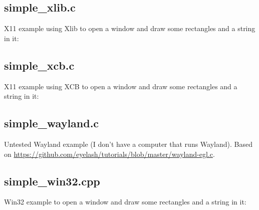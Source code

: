 \documentclass{article}
\begin{document}
\subsection{simple\_xlib.c}
\label{subsec:simple_xlib.c}

X11 example using Xlib to open a window and draw some rectangles and a string
in it:



\subsection{simple\_xcb.c}
\label{subsec:simple_xcb.c}

X11 example using XCB to open a window and draw some rectangles and a string
in it:



\subsection{simple\_wayland.c}
\label{subsec:simple_wayland.c}

Untested Wayland example (I don't have a computer that runs Wayland).
Based on \url{https://github.com/eyelash/tutorials/blob/master/wayland-egl.c}.



\subsection{simple\_win32.cpp}
\label{subsec:simple_win32.cpp}

Win32 example to open a window and draw some rectangles and a string in it:


\end{document}
